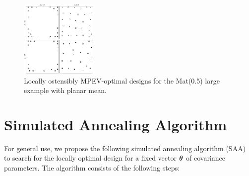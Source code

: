 \documentclass[12pt]{article}
\def\btheta{\mbox{\boldmath$\theta$}}
\begin{document}
        \begin{figure}
        \begin{center}
        \includegraphics[width=0.33\textwidth]{saablup_planar.pdf}
        \caption{Locally ostensibly MPEV-optimal designs for the Mat(0.5) large example with planar mean.}\label{fig:mepevlarger}
        \end{center}
        \end{figure}

\newpage

\section{Simulated Annealing Algorithm}
\normalsize

For general use, we propose the following simulated
        annealing algorithm (SAA) to search for the locally optimal design for a fixed vector $\btheta$ of covariance parameters. The algorithm consists of the following steps:
\end{document}
